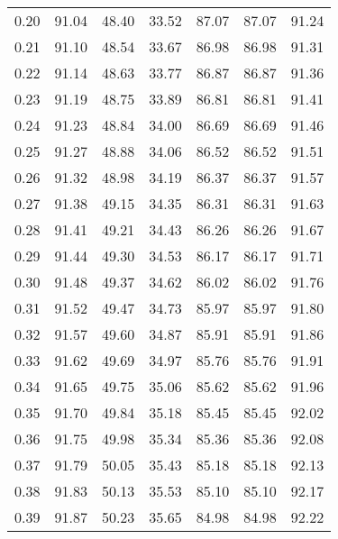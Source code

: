 \begin{tabular}{|c|c|c|c|c|c|c|}
      0.20 &     91.04 &     48.40 &      33.52 &   87.07 &      87.07 &         91.24 \\
      0.21 &     91.10 &     48.54 &      33.67 &   86.98 &      86.98 &         91.31 \\
      0.22 &     91.14 &     48.63 &      33.77 &   86.87 &      86.87 &         91.36 \\
      0.23 &     91.19 &     48.75 &      33.89 &   86.81 &      86.81 &         91.41 \\
      0.24 &     91.23 &     48.84 &      34.00 &   86.69 &      86.69 &         91.46 \\
      0.25 &     91.27 &     48.88 &      34.06 &   86.52 &      86.52 &         91.51 \\
      0.26 &     91.32 &     48.98 &      34.19 &   86.37 &      86.37 &         91.57 \\
      0.27 &     91.38 &     49.15 &      34.35 &   86.31 &      86.31 &         91.63 \\
      0.28 &     91.41 &     49.21 &      34.43 &   86.26 &      86.26 &         91.67 \\
      0.29 &     91.44 &     49.30 &      34.53 &   86.17 &      86.17 &         91.71 \\
      0.30 &     91.48 &     49.37 &      34.62 &   86.02 &      86.02 &         91.76 \\
      0.31 &     91.52 &     49.47 &      34.73 &   85.97 &      85.97 &         91.80 \\
      0.32 &     91.57 &     49.60 &      34.87 &   85.91 &      85.91 &         91.86 \\
      0.33 &     91.62 &     49.69 &      34.97 &   85.76 &      85.76 &         91.91 \\
      0.34 &     91.65 &     49.75 &      35.06 &   85.62 &      85.62 &         91.96 \\
      0.35 &     91.70 &     49.84 &      35.18 &   85.45 &      85.45 &         92.02 \\
      0.36 &     91.75 &     49.98 &      35.34 &   85.36 &      85.36 &         92.08 \\
      0.37 &     91.79 &     50.05 &      35.43 &   85.18 &      85.18 &         92.13 \\
      0.38 &     91.83 &     50.13 &      35.53 &   85.10 &      85.10 &         92.17 \\
      0.39 &     91.87 &     50.23 &      35.65 &   84.98 &      84.98 &         92.22 \\

\end{tabular}
